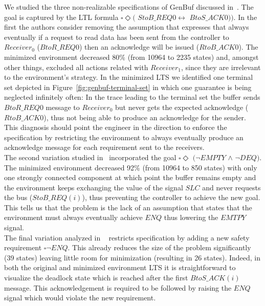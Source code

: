 We studied the three non-realizable specifications of GenBuf discussed in~\cite{DBLP:conf/fmcad/KonighoferHB09}. 
The goal is captured by the LTL formula $\square\Diamond($ $StoB\_REQ0  \leftrightarrow$ $BtoS\_ACK0))$.
 In the first the authors consider removing the assumption 
that expresses that always eventually if a request to read data
has been sent from the controller to $Receiver_0$ ($BtoR\_REQ0$) then
an acknowledge will be issued ($RtoB\_ACK0$).  
The minimized environment decreased 80\%
(from 10964 to 2235 states) and, amongst other things, excluded all actions related with $Receiver_1$,
since they are irrelevant to the environment's strategy.
In the minimized LTS we identified one terminal set
depicted in Figure~\ref{fig:genbuf-terminal-set} in which one guarantee is being 
neglected infinitely often: 
  In the trace leading to the terminal set
the buffer sends \\$BtoR\_REQ0$ message to $Receiver_0$ but
never gets the expected acknowledge ($RtoB\_ACK0$), thus
not being able to produce an acknowledge for the sender.  This
diagnosis should point the engineer in the direction to
enforce the specification by restricting the environment to always
eventually produce an acknowledge message for each requirement
sent to the receivers.\\
The second variation studied in~\cite{DBLP:conf/fmcad/KonighoferHB09}  incorporated the goal 
$\square \Diamond$ $(\neg EMPTY$ $\wedge$ $\neg DEQ)$.
The minimized environment decreased 92\%
(from 10964 to 850 states)
with only one strongly connected component at which point the buffer remains empty and the environment keeps exchanging the value of the
signal $SLC$ and never requests the bus ($StoB\_REQ(i)$), thus preventing the controller to achieve the new goal. This tells us that the problem is the lack of an assumption that states that the environment must always eventually achieve $ENQ$ thus lowering the $EMTPY$ signal. 
\\
The final variation analyzed in ~\cite{DBLP:conf/fmcad/KonighoferHB09} restricts specification by
adding a new safety requirement $\square \neg ENQ$. This already reduces the size of the 
problem significantly (39 states) leaving little room for minimization (resulting in 26 states). Indeed, in both the original and minimized environment LTS it is straightforward to visualize the deadlock state which is reached after the first
$BtoS\_ACK(i)$ message. This acknowledgement is required to be followed by raising the $ENQ$ signal which would violate the new requirement. 

